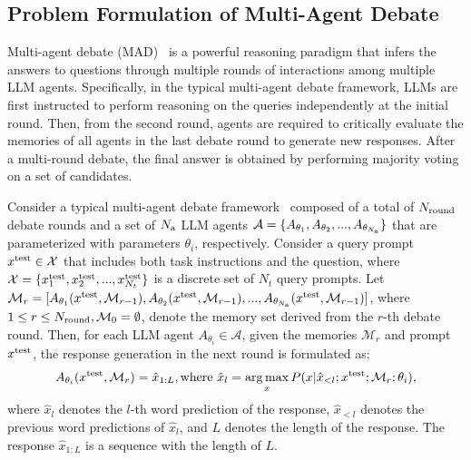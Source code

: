 \documentclass{article} %
\newcommand{\uprmvar}[2]{#1^{\rm #2}}
\theoremstyle{plain}
\begin{document}
\vspace{-6pt}
\subsection{Problem Formulation of Multi-Agent Debate}\label{subsec:mad_formulation}
\vspace{-4pt}
Multi-agent debate (MAD)~\citep{mad_yilun} is a powerful reasoning paradigm that infers the answers to questions through multiple rounds of interactions among multiple LLM agents. Specifically, in the typical multi-agent debate framework, LLMs are first instructed to perform reasoning on the queries independently at the initial round. Then, from the second round, agents are required to critically evaluate the memories of all agents in the last debate round to generate new responses. After a multi-round debate, the final answer is obtained by performing majority voting on a set of candidates. 

Consider a typical multi-agent debate framework~\citep{mad_yilun} composed of a total of $N_{\rm round}$ debate rounds and a set of $N_{\rm a}$ LLM agents $\mathcal{A}=\{A_{\theta_1}, A_{\theta_2}, ..., A_{\theta_{N_{\rm a}}}\}$ that are parameterized with parameters $\theta_i$, respectively. Consider a query prompt $\uprmvar{x}{test}\in\mathcal{X}$ that includes both task instructions and the question, where $\mathcal{X}=\{\uprmvar{x}{test}_1, \uprmvar{x}{test}_2, ..., \uprmvar{x}{test}_{N_t}\}$ is a discrete set of $N_t$ query prompts. Let $\mathcal{M}_r=[A_{\theta_1}(\uprmvar{x}{test}, \mathcal{M}_{r-1}), A_{\theta_2}(\uprmvar{x}{test}, \mathcal{M}_{r-1}), ..., A_{\theta_{N_{\rm a}}}(\uprmvar{x}{test}, \mathcal{M}_{r-1})]$, where $1\leq r\leq N_{\rm round}, \mathcal{M}_0=\emptyset$, denote the memory set derived from the $r$-th debate round. Then, for each LLM agent $A_{\theta_i}\in\mathcal{A}$, given the memories $\mathcal{M}_r$ and prompt $\uprmvar{x}{test}$, the response generation in the next round is formulated as:
\begin{equation}
\label{eq:agent_generation}
\centering
    A_{\theta_i}(\uprmvar{x}{test}, \mathcal{M}_r) = \hat{x}_{1:L}, \text{where}\  \hat{x}_l=\mathop{\arg\max}_{x} P(x|\hat{x}_{<l}; \uprmvar{x}{test}; \mathcal{M}_{r}; \theta_i),
\end{equation}
where $\hat{x}_l$ denotes the $l$-th word prediction of the response, $\hat{x}_{<l}$ denotes the previous word predictions of $\hat{x}_l$, and $L$ denotes the length of the response. The response $\hat{x}_{1:L}$ is a sequence with the length of $L$.
\end{document}
